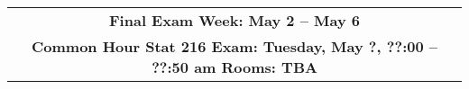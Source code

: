 \documentclass[letterpaper,12pt]{article}
\begin{document}
\begin{center}
\begin{tabular}{|c|c|c|}
  \multicolumn{3}{|c|}{\textbf{Final Exam Week: May 2 -- May 6 }} \\
  \multicolumn{3}{|c|}{\bf{ Common Hour Stat 216  Exam: 
      Tuesday, May ?, ??:00 -- ??:50 am Rooms: TBA}} \\
\hline

\end{tabular}
\vspace{.2in} \\
\end{center}
\end{document}
